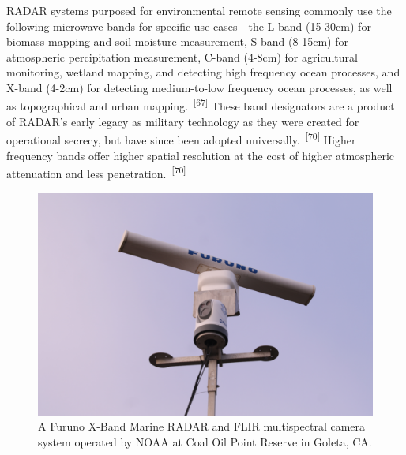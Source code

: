 \documentclass{article}
\begin{document}

\par{RADAR systems purposed for environmental remote sensing commonly use the following microwave bands for specific use-cases---the L-band (15-30cm) for biomass mapping and soil moisture measurement, S-band (8-15cm) for atmospheric percipitation measurement, C-band (4-8cm) for agricultural monitoring, wetland mapping, and detecting high frequency ocean processes, and X-band (4-2cm) for detecting medium-to-low frequency ocean processes, as well as topographical and urban mapping.~\textsuperscript{[67]} These band designators are a product of RADAR's early legacy as military technology as they were created for operational secrecy, but have since been adopted universally.~\textsuperscript{[70]} Higher frequency bands offer higher spatial resolution at the cost of higher atmospheric attenuation and less penetration.~\textsuperscript{[70]}}


\begin{figure}
    \centering
    \includegraphics[width=1\linewidth]{images/furuno-x-band-radar.JPG}
    \caption{A Furuno X-Band Marine RADAR and FLIR multispectral camera system operated by NOAA at Coal Oil Point Reserve in Goleta, CA.}
    \label{figure19}
\end{figure}

\end{document}
